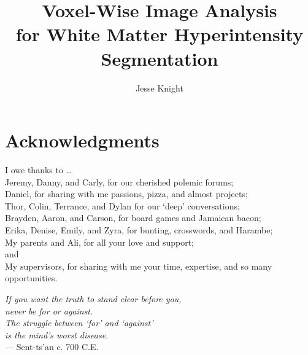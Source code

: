 \title{Voxel-Wise Image Analysis\\for White Matter Hyperintensity Segmentation}
\author{Jesse Knight}



\maketitle
\cleardoublepage{}
\setcounter{page}{1}
\begin{abstractpage}
  
\end{abstractpage}
\cleardoublepage{}
\section*{Acknowledgments}
I owe thanks to \dots
\\Jeremy, Danny, and Carly, for our cherished polemic forums;
\\Daniel, for sharing with me passions, pizza, and almost projects;
\\Thor, Colin, Terrance, and Dylan for our `deep' conversations;
\\Brayden, Aaron, and Carson, for board games and Jamaican bacon;
\\Erika, Denise, Emily, and Zyra, for bunting, crosswords, and Harambe;
\\My parents and Ali, for all your love and support;
\\and
\\My supervisors, for sharing with me your time, expertise, and so many opportunities.
\vfill
\begin{singlespace}
  \hspace*{4.0cm}\textit{If you want the truth to stand clear before you,}\\
  \hspace*{4.5cm}\textit{never be for or against.}                        \\
  \hspace*{4.0cm}\textit{The struggle between `for' and `against'}        \\
  \hspace*{4.5cm}\textit{is the mind's worst disease.}                    \\[0.5em]
  \hspace*{9.0cm}\normalfont{} --- Sent-ts'an c. 700 C.E.
\end{singlespace}
